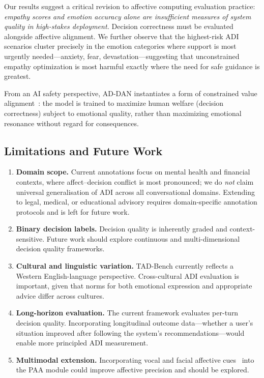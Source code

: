 \documentclass[lettersize,journal]{IEEEtran}
\begin{document}
Our results suggest a critical revision to affective computing evaluation
practice: \emph{empathy scores and emotion accuracy alone are insufficient
measures of system quality in high-stakes deployment.}  Decision correctness
must be evaluated alongside affective alignment.  We further observe that
the highest-risk ADI scenarios cluster precisely in the emotion categories
where support is most urgently needed—anxiety, fear, devastation—suggesting
that unconstrained empathy optimization is most harmful exactly where the
need for safe guidance is greatest.

From an AI safety perspective, AD-DAN instantiates a form of constrained
value alignment~\cite{hendrycks2021values,ouyang2022instructgpt}: the model
is trained to maximize human welfare (decision correctness) subject to
emotional quality, rather than maximizing emotional resonance without regard
for consequences.

\subsection{Limitations and Future Work}

\begin{enumerate}
\item \textbf{Domain scope.}  Current annotations focus on mental health
and financial contexts, where affect--decision conflict is most
pronounced; we do \emph{not} claim universal generalisation of ADI
across all conversational domains.  Extending to legal, medical, or
educational advisory requires domain-specific annotation protocols
and is left for future work.

\item \textbf{Binary decision labels.}  Decision quality is inherently
graded and context-sensitive.  Future work should explore continuous and
multi-dimensional decision quality frameworks.

\item \textbf{Cultural and linguistic variation.}  TAD-Bench currently
reflects a Western English-language perspective.  Cross-cultural ADI
evaluation is important, given that norms for both emotional expression and
appropriate advice differ across cultures.

\item \textbf{Long-horizon evaluation.}  The current framework evaluates
per-turn decision quality.  Incorporating longitudinal outcome data—whether
a user's situation improved after following the system's recommendations—would
enable more principled ADI measurement.

\item \textbf{Multimodal extension.}  Incorporating vocal and facial
affective cues~\cite{busso2008iemocap,kim2023angle} into the PAA module
could improve affective precision and should be explored.
\end{enumerate}
\end{document}
